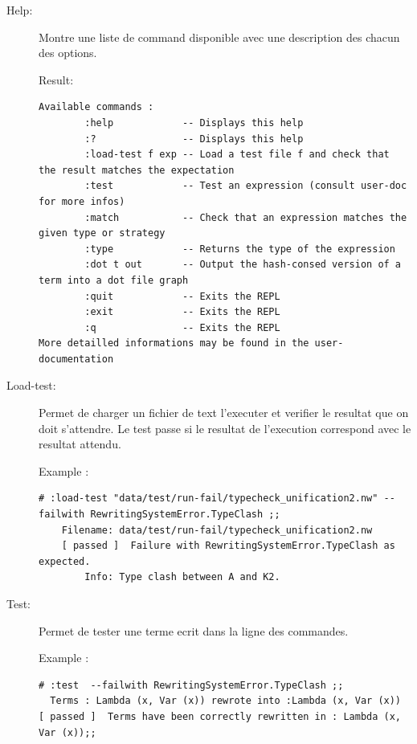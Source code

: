 \documentclass[12pt,a4paper]{article}
\begin{document}
\begin{description}

\item[Help:]
Montre une liste de command disponible avec une description des chacun
des options.

\begin{minipage}{\textwidth}
Result:
\begin{lstlisting}[breaklines=true,basicstyle=\ttfamily\footnotesize]
Available commands :
        :help            -- Displays this help
        :?               -- Displays this help
        :load-test f exp -- Load a test file f and check that the result matches the expectation
        :test            -- Test an expression (consult user-doc for more infos)
        :match           -- Check that an expression matches the given type or strategy
        :type            -- Returns the type of the expression
        :dot t out       -- Output the hash-consed version of a term into a dot file graph
        :quit            -- Exits the REPL
        :exit            -- Exits the REPL
        :q               -- Exits the REPL
More detailled informations may be found in the user-documentation
\end{lstlisting}
\end{minipage}

\item[Load-test:]
Permet de charger un fichier de text l'executer et verifier le resultat que on
doit s'attendre. Le test passe si le resultat de l'execution
correspond avec le resultat attendu. \\

\begin{minipage}{\textwidth}
Example :
\begin{lstlisting}[breaklines=true,basicstyle=\ttfamily\footnotesize]
  # :load-test "data/test/run-fail/typecheck_unification2.nw" --failwith RewritingSystemError.TypeClash ;;
    Filename: data/test/run-fail/typecheck_unification2.nw
    [ passed ]  Failure with RewritingSystemError.TypeClash as expected.
        Info: Type clash between A and K2.
\end{lstlisting}
\end{minipage}

\item[Test:]
Permet de tester une terme ecrit dans la ligne des commandes.\\

 \begin{minipage}{\textwidth}
Example :
\begin{lstlisting}[breaklines=true,basicstyle=\ttfamily\footnotesize]
  # :test  --failwith RewritingSystemError.TypeClash ;;
  Terms : Lambda (x, Var (x)) rewrote into :Lambda (x, Var (x))
[ passed ]  Terms have been correctly rewritten in : Lambda (x, Var (x));;
\end{lstlisting}
\end{minipage}


\end{description}
\end{document}
